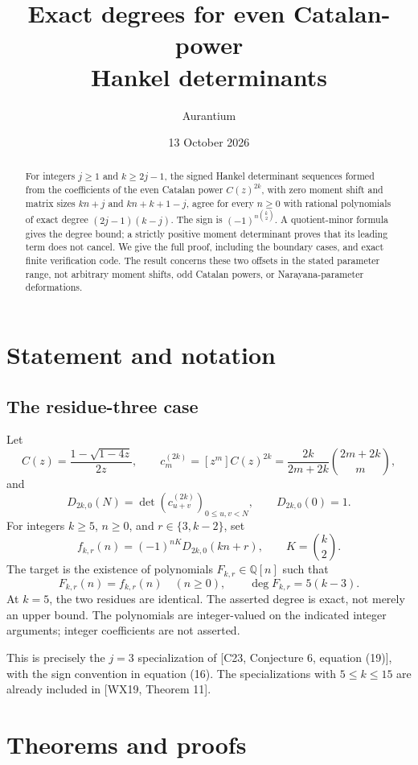 \documentclass[
  11pt,
]{article}
\title{Exact degrees for even Catalan-power\\Hankel determinants}
\author{Aurantium}
\date{13 October 2026}
\begin{document}
\maketitle

\begin{abstract}
For integers \(j\ge1\) and \(k\ge2j-1\), the signed Hankel determinant
sequences formed from the coefficients of the even Catalan power
\(C(z)^{2k}\), with zero moment shift and matrix sizes \(kn+j\) and
\(kn+k+1-j\), agree for every \(n\ge0\) with rational polynomials of
exact degree \((2j-1)(k-j)\). The sign is
\((-1)^{n\binom{k}{2}}\). A quotient-minor formula gives the degree bound;
a strictly positive moment determinant proves that its leading term does
not cancel. We give the full proof, including the boundary cases, and
exact finite verification code. The result concerns these two offsets
in the stated parameter range, not arbitrary moment shifts, odd Catalan
powers, or Narayana-parameter deformations.
\end{abstract}

\section{Statement and notation}\label{problem}

\subsection{The residue-three case}\label{exact-reconstruction}

Let \[
 C(z)=\frac{1-\sqrt{1-4z}}{2z},\qquad
 c_m^{(2k)}=[z^m]C(z)^{2k}
 =\frac{2k}{2m+2k}\binom{2m+2k}{m},
\] and \[
 D_{2k,0}(N)=\det(c_{u+v}^{(2k)})_{0\le u,v<N},\qquad
 D_{2k,0}(0)=1.
\] For integers \(k\ge5\), \(n\ge0\), and \(r\in\{3,k-2\}\), set \[
 f_{k,r}(n)=(-1)^{nK}D_{2k,0}(kn+r),\qquad K=\binom{k}{2}.
\] The target is the existence of polynomials \(F_{k,r}\in\mathbb Q[n]\)
such that \[
 F_{k,r}(n)=f_{k,r}(n)\quad(n\ge0),\qquad
 \deg F_{k,r}=5(k-3).
\] At \(k=5\), the two residues are identical. The asserted degree is
exact, not merely an upper bound. The polynomials are integer-valued on
the indicated integer arguments; integer coefficients are not asserted.

This is precisely the \(j=3\) specialization of {[}C23, Conjecture 6,
equation (19){]}, with the sign convention in equation (16). The
specializations with \(5\le k\le15\) are
already included in {[}WX19, Theorem 11{]}.

\section{Theorems and proofs}\label{result}
\end{document}
